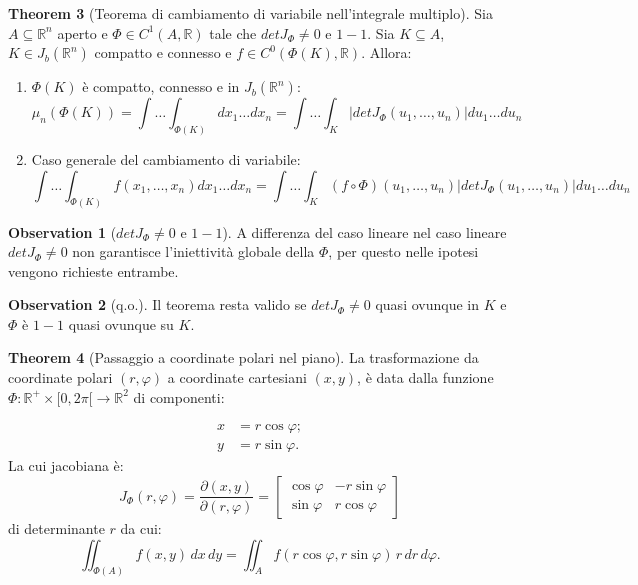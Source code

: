 \documentclass[leqno]{article}
\theoremstyle{definition}
\numberwithin{equation}{section}
\newtheorem{theorem}{Theorem}[section]
\newtheorem{observation}[theorem]{Observation}
\theoremstyle{remark}
\begin{document}
	\begin{theorem}[Teorema di cambiamento di variabile nell'integrale multiplo]
		Sia $A\subseteq \mathbb{R}^n$ aperto e $\Phi \in C^1(A,\mathbb{R})$ tale che $detJ_\Phi \neq 0$ e $1-1$. Sia $K\subseteq A$, $K\in J_b(\mathbb{R}^n)$ compatto e connesso e $f\in C^0(\Phi(K),\mathbb{R})$. Allora:
		\begin{enumerate}
			\item $\Phi(K)$ è compatto, connesso e in $J_b(\mathbb{R}^n)$:
			\begin{equation}
				\mu_n(\Phi(K))=\int \dots \int_{\Phi(K)}dx_1 \dots dx_n=\int \dots \int_K\left| detJ_\Phi (u_1,\dots ,u_n)\right| du_1\dots du_n
			\end{equation}
			\item Caso generale del cambiamento di variabile:
			\begin{equation}
				\int \dots \int_{\Phi(K)}f(x_1,\dots ,x_n)dx_1\dots dx_n=\int \dots \int_K(f \circ \Phi)(u_1, \dots, u_n)\left| detJ_\Phi (u_1,\dots ,u_n)\right| du_1\dots du_n
			\end{equation}
		\end{enumerate}
		\begin{observation}[$detJ_\Phi \neq 0$ e $1-1$]
			A differenza del caso lineare nel caso lineare $detJ_\Phi \neq 0$ non garantisce l'iniettività globale della $\Phi$, per questo nelle ipotesi vengono richieste entrambe.
		\end{observation}
		\begin{observation}[q.o.]
			Il teorema resta valido se $detJ_\Phi \neq 0$ quasi ovunque in $K$ e $\Phi$ è $1-1$ quasi ovunque su $K$.    
		\end{observation}
	\end{theorem}
	\begin{theorem}[Passaggio a coordinate polari nel piano]
		
		La trasformazione da coordinate polari $(r,\varphi)$ a coordinate cartesiani $(x,y)$, è data dalla funzione $\Phi : \mathbb{R}^+ \times [0,2\pi[ \to \mathbb{R}^2$ di componenti: 
		
		\begin{align*} 
			x&=r\cos \varphi ;\\y&=r\sin \varphi .
		\end{align*}
		La cui jacobiana è:
		\begin{equation}
			J _{\Phi} (r,\varphi )=\dfrac{\partial(x,y)}{\partial(r,\varphi)}={\begin{bmatrix}\cos \varphi &-r\sin \varphi \\\sin \varphi &r\cos \varphi \end{bmatrix}}
		\end{equation}
		di determinante $r$ da cui:
		\begin{equation}
			\iint _{\Phi(A)}f(x,y)\,dx\,dy=\iint _{A}f(r\cos \varphi ,r\sin \varphi )\,r\,dr\,d\varphi .
		\end{equation}
	\end{theorem}
\end{document}
